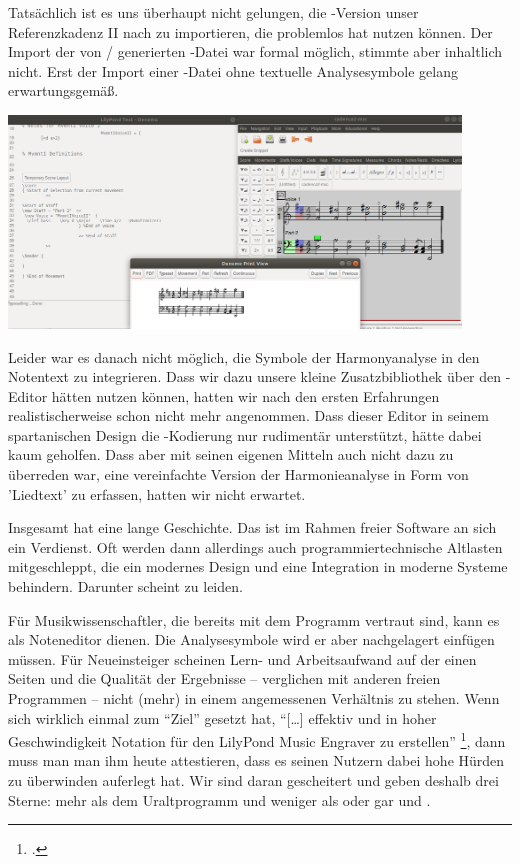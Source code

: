 Tatsächlich ist es uns überhaupt nicht gelungen, die -Version
unser Referenzkadenz II nach   zu importieren, die 
problemlos hat nutzen können. Der Import der von  /
 generierten -Datei war formal möglich, stimmte aber
inhaltlich nicht. Erst der Import einer -Datei ohne textuelle
Analysesymbole gelang erwartungsgemäß.

\begin{center}
\includegraphics[width=0.9\textwidth]{frontends/denemo/denemo-cadenca2-300dpi.png}
\end{center}

Leider war es danach nicht möglich, die Symbole der Harmonyanalyse in den
Notentext zu integrieren. Dass wir dazu unsere kleine Zusatzbibliothek über den
-Editor hätten nutzen können, hatten wir nach den ersten
Erfahrungen realistischerweise schon nicht mehr angenommen. Dass dieser Editor in
seinem spartanischen Design die -Kodierung nur rudimentär
unterstützt, hätte dabei kaum geholfen. Dass aber  mit seinen
eigenen Mitteln auch nicht dazu zu überreden war, eine vereinfachte Version der
Harmonieanalyse in Form von 'Liedtext' zu erfassen, hatten wir nicht erwartet.

Insgesamt hat  eine lange Geschichte. Das ist im Rahmen freier
Software an sich ein Verdienst. Oft werden dann allerdings auch
programmiertechnische Altlasten mitgeschleppt, die ein modernes Design
und eine Integration in moderne Systeme behindern. Darunter scheint 
zu leiden.

Für Musikwissenschaftler, die bereits mit dem Programm vertraut sind, kann es
als Noteneditor dienen. Die Analysesymbole wird er aber nachgelagert einfügen
müssen. Für Neueinsteiger scheinen Lern- und Arbeitsaufwand auf der einen Seiten
und die Qualität der Ergebnisse -- verglichen mit anderen freien Programmen --
nicht (mehr) in einem angemessenen Verhältnis zu stehen. Wenn  sich
wirklich einmal zum \enquote{Ziel} gesetzt hat, \enquote{[\ldots] effektiv und
in hoher Geschwindigkeit Notation für den LilyPond Music Engraver zu erstellen}
\footcite[vgl.][\nopage wp]{WpedDenemo2018a}, dann muss man man ihm heute
attestieren, dass es seinen Nutzern dabei hohe Hürden zu überwinden auferlegt
hat. Wir sind daran gescheitert und geben  deshalb drei Sterne:
mehr als dem Uraltprogramm  und weniger als  oder gar 
 und .
%
